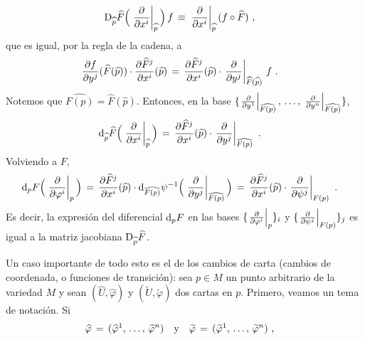 \begin{align*}
	\jacobiana[\widehat{p}]{\widehat{F}}\Big(
		\left.\gancho{x^{i}}\right|_{\widehat{p}}\Big)\,f &
		\,\equiv\,\left.\gancho{x^{i}}\right|_{\widehat{p}}
			(f\circ\widehat{F})
	\text{ ,}
\end{align*}
%
que es igual, por la regla de la cadena, a
\begin{align*}
	\derivada{f}{y^{j}}(\widehat{F}(\widehat{p}))\cdot
		\derivada{\widehat{F}^{j}}{x^{i}}(\widehat{p}) &
		\,=\,\derivada{\widehat{F}^{j}}{x^{i}}(\widehat{p})\cdot
		\left.\gancho{y^{j}}\right|_{\widehat{F}(\widehat{p})}\,f
	\text{ .}
\end{align*}
%
Notemos que $\widehat{F(p)}=\widehat{F}(\widehat{p})$. Entonces, en la base
$\{\gancho[\widehat{F(p)}]{y^{1}},\,\dots,\,\gancho[\widehat{F(p)}]{y^{n}}\}$,
\begin{align*}
	\diferencial[\widehat{p}]{\widehat{F}}\Big(
		\gancho[\widehat{p}]{x^{i}}\Big) & \,=\,
		\derivada{\widehat{F}^{j}}{x^{i}}(\widehat{p})\cdot
			\gancho[\widehat{F(p)}]{y^{j}}
	\text{ .}
\end{align*}
%
Volviendo a $F$,
\begin{align*}
	\diferencial[p]{F}\Big(\gancho[p]{\varphi^{i}}\Big) & \,=\,
		\derivada{\widehat{F}^{j}}{x^{i}}(\widehat{p})\cdot
		\diferencial[\widehat{F(p)}]{\psi^{-1}}\Big(
			\gancho[\widehat{F(p)}]{y^{j}}\Big)
		\,=\,\derivada{\widehat{F}^{j}}{x^{i}}(\widehat{p})\cdot
			\gancho[F(p)]{\psi^{j}}
	\text{ .}
\end{align*}
%
Es decir, la expresi\'{o}n del diferencial  $\diferencial[p]{F}$ en las
bases $\{\gancho[p]{\varphi^{i}}\}_{i}$ y $\{\gancho[F(p)]{\psi^{j}}\}_{j}$
es igual a la matriz jacobiana $\jacobiana[\widehat{p}]{\widehat{F}}$.

Un caso importante de todo esto es el de los cambios de carta (cambios de
coordenada, o funciones de transici\'{o}n): sea $p\in M$ un punto arbitrario
de la variedad $M$ y sean $(\widehat{U},\widehat{\varphi})$ y
$(\widetilde{U},\widetilde{\varphi})$ dos cartas en $p$. Primero,
veamos un tema de notaci\'{o}n. Si
\begin{align*}
	\widehat{\varphi} & \,=\,(\lista*{\widehat{\varphi}}{n})
	\quad\text{y}\quad
	\widetilde{\varphi}\,=\,(\lista*{\widetilde{\varphi}}{n})
	\text{ ,}
\end{align*}
%


